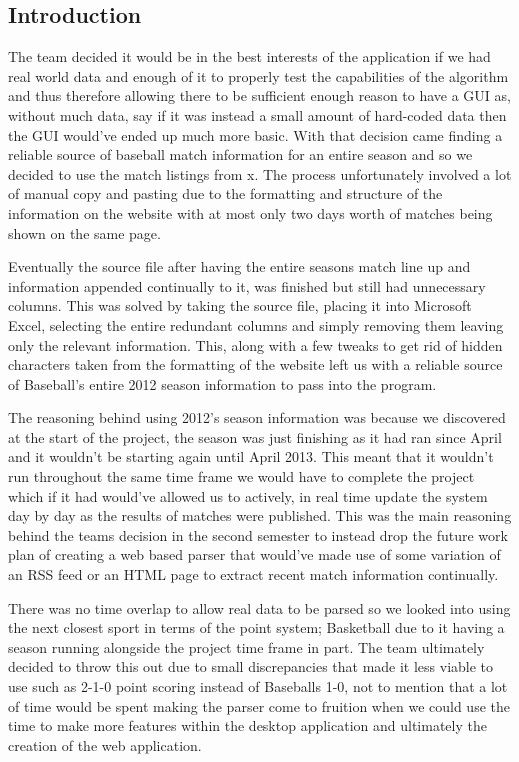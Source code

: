 \subsection{Introduction}

The team decided it would be in the best interests of the application if we had real world data and enough of it to properly test the capabilities of the algorithm and thus therefore allowing there to be sufficient enough reason to have a GUI as, without much data, say if it was instead a small amount of hard-coded data then the GUI would've ended up much more basic. With that decision came finding a reliable source of baseball match information for an entire season and so we decided to use the match listings from x. The process unfortunately involved a lot of manual copy and pasting due to the formatting and structure of the information on the website with at most only two days worth of matches being shown on the same page. 

Eventually the source file after having the entire seasons match line up and information appended continually to it, was finished but still had unnecessary columns. This was solved by taking the source file, placing it into Microsoft Excel, selecting the entire redundant columns and simply removing them leaving only the relevant information. This, along with a few tweaks to get rid of hidden characters taken from the formatting of the website left us with a reliable source of Baseball's entire 2012 season information to pass into the program.

The reasoning behind using 2012's season information was because we discovered at the start of the project, the season was just finishing as it had ran since April and it wouldn't be starting again until April 2013. This meant that it wouldn't run throughout the same time frame we would have to complete the project which if it had would've allowed us to actively, in real time update the system day by day as the results of matches were published. This was the main reasoning behind the teams decision in the second semester to instead drop the future work plan of creating a web based parser that would've made use of some variation of an RSS feed or an HTML page to extract recent match information continually. 

There was no time overlap to allow real data to be parsed so we looked into using the next closest sport in terms of the point system; Basketball due to it having a season running alongside the project time frame in part. The team ultimately decided to throw this out due to small discrepancies that made it less viable to use such as 2-1-0 point scoring instead of Baseballs 1-0, not to mention that a lot of time would be spent making the parser come to fruition when we could use the time to make more features within the desktop application and ultimately the creation of the web application.

